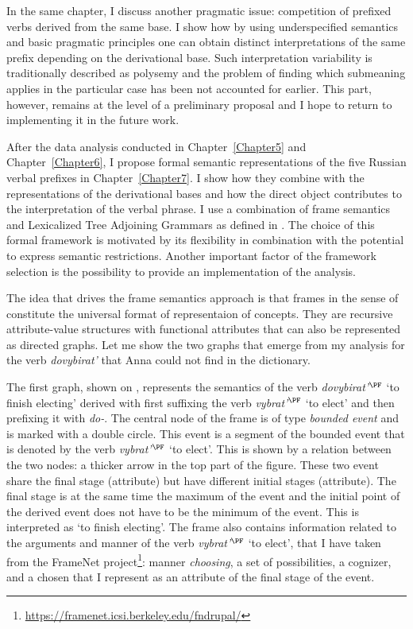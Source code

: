 In the same chapter, I discuss another pragmatic issue: competition of prefixed verbs derived from the same base. I show how by using underspecified semantics and basic pragmatic principles one can obtain distinct interpretations of the same prefix depending on the derivational base. Such interpretation variability is traditionally described as polysemy and the problem of finding which submeaning applies in the particular case has been not accounted for earlier. This part, however, remains at the level of a preliminary proposal and I hope to return to implementing it in the future work.

After the data analysis conducted in Chapter~\ref{Chapter5} and Chapter~\ref{Chapter6}, I propose formal semantic representations of the five Russian verbal prefixes in Chapter~\ref{Chapter7}. I show how they combine with the representations of the derivational bases and how the direct object contributes to the interpretation of the verbal phrase. I use a combination of frame semantics and Lexicalized Tree Adjoining Grammars as defined in \citealt{KallmeyerOsswald:13}. The choice of this formal framework is motivated by its flexibility in combination with the potential to express semantic restrictions. Another important factor of the framework selection is the possibility to provide an implementation of the analysis. 

The idea that drives the frame semantics approach \citep{Loebner:2014} is that frames in the sense of \citet{Barsalou:92} constitute the universal format of representaion of concepts. They are recursive attribute-value structures with functional attributes that can also be represented as directed graphs. Let me show the two graphs that emerge from my analysis for the verb \textit{dovybirat'} that Anna could not find in the dictionary.

The first graph, shown on , represents the semantics of the verb \textit{dovybirat'}$^{\PF}$ `to finish electing' derived with first suffixing the verb \textit{vybrat'}$^{\PF}$ `to elect' and then prefixing it with \textit{do-}. The central node of the frame is of type \textit{bounded event} and is marked with a double circle. This event is a segment of the bounded event that is denoted by the verb \textit{vybrat'}$^{\PF}$ `to elect'. This is shown by a relation between the two nodes: a thicker arrow in the top part of the figure. These two event share the final stage (\FIN attribute) but have different initial stages (\INIT attribute). The final stage is at the same time the maximum of the event and the initial point of the derived event does not have to be the minimum of the event. This is interpreted as `to finish electing'. The frame also contains information related to the arguments and manner of the verb \textit{vybrat'}$^{\PF}$ `to elect', that I have taken from the FrameNet project\footnote{\url{https://framenet.icsi.berkeley.edu/fndrupal/}}: manner \textit{choosing}, a set of possibilities, a cognizer, and a chosen that I represent as an attribute of the final stage of the event.

